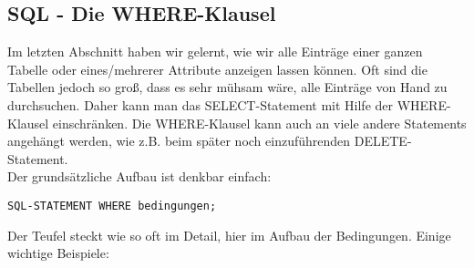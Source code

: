 \subsection[WHERE-Klausel]{SQL - Die WHERE-Klausel}\label{where}
Im letzten Abschnitt haben wir gelernt, wie wir alle Einträge einer ganzen Tabelle oder eines/mehrerer Attribute anzeigen lassen können. Oft sind die Tabellen jedoch so groß, dass es sehr mühsam wäre, alle Einträge von Hand zu durchsuchen. Daher kann man das SELECT-Statement mit Hilfe der WHERE-Klausel einschränken. Die WHERE-Klausel kann auch an viele andere Statements angehängt werden, wie z.B. beim später noch einzuführenden DELETE-Statement.\\
Der grundsätzliche Aufbau ist denkbar einfach:
\begin{tcolorbox}[title=WHERE-Klausel]
	\lstinline!SQL-STATEMENT WHERE bedingungen;!
\end{tcolorbox}
Der Teufel steckt wie so oft im Detail, hier im Aufbau der Bedingungen. Einige wichtige Beispiele:
